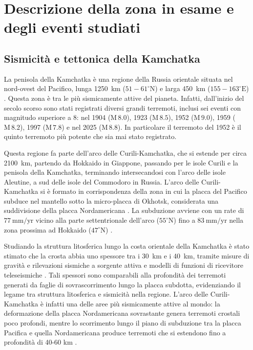 \chapter{Descrizione della zona in esame e degli eventi studiati}

\section{Sismicità e tettonica della Kamchatka}
La penisola della Kamchatka è una regione della Russia orientale situata nel nord-ovest del Pacifico, lunga \qty{1250}{\kilo\meter} (\(51-61^\circ \text{N}\)) e larga \qty{450}{\kilo\meter} (\(155-163 ^\circ \text{E}\)) \citep{glacier_mass}. Questa zona è tra le più sismicamente attive del pianeta. Infatti, dall'inizio del secolo scorso sono stati registrati diversi grandi terremoti, inclusi sei eventi con magnitudo superiore a 8: nel 1904 (\(\mathrm{M}\,8.0\)), 1923 (\(\mathrm{M}\,8.5\)), 1952 (\(\mathrm{M}\,9.0\)), 1959 (\(\mathrm{M}\,8.2\)), 1997 (\(\mathrm{M}\,7.8\)) e nel 2025 (\(\mathrm{M}\,8.8\)). In particolare il terremoto del 1952 è il quinto terremoto più potente che sia mai stato registrato.

Questa regione fa parte dell'arco delle Curili-Kamchatka, che si estende per circa \qty{2100}{\kilo\meter}, partendo da Hokkaido in Giappone, passando per le isole Curili e la penisola della Kamchatka, terminando intersecandosi con l'arco delle isole Aleutine, a sud delle isole del Commodoro in Russia.
L'arco delle Curili-Kamchatka si è formato in corrispondenza della zona in cui la placca del Pacifico subduce nel mantello sotto la micro-placca di Okhotsk, considerata una suddivisione della placca Nordamericana \citep{usgs2025qw60}. La subduzione avviene con un rate di \(77~\mathrm{mm/yr}\) vicino alla parte settentrionale dell'arco (\(55 ^\circ \text{N}\)) fino a \(83~\mathrm{mm/yr}\) nella zona prossima ad Hokkaido (\(47 ^\circ \text{N}\)) \citep{description}.

Studiando la struttura litosferica lungo la costa orientale della Kamchatka è stato stimato che la crosta abbia uno spessore tra i \qty{30}{\kilo\meter} e i \qty{40}{\kilo\meter}, tramite misure di gravità e rilevazioni sismiche a sorgente attiva \citep{bogdanov2000tectonic} e modelli di funzioni di ricevitore teleseismiche \citep{levin2002}.
Tali spessori sono comparabili alla profondità dei terremoti generati da faglie di sovrascorrimento lungo la placca subdotta, evidenziando il legame tra struttura litosferica e sismicità nella regione.
L'arco delle Curili-Kamchatka è infatti una delle aree più sismicamente attive al mondo: la deformazione della placca Nordamericana sovrastante genera terremoti crostali poco profondi, mentre lo scorrimento lungo il piano di subduzione tra la placca Pacifica e quella Nordamericana produce terremoti che si estendono fino a profondità di 40-60 km \citep{usgs2025qw60}.

